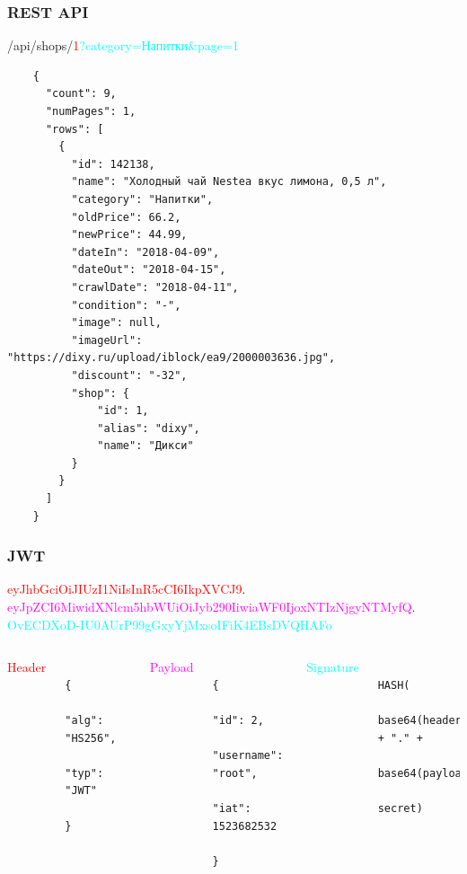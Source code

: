 \documentclass{beamer}
\begin{document}
\begin{frame}[fragile]
    \frametitle{REST API}

    /api/shops/\textcolor{red}{1}\textcolor{cyan}{?category=Напитки\&page=1}
    \medskip
    \begin{verbatim}
    {
      "count": 9,
      "numPages": 1,
      "rows": [
        {
          "id": 142138,
          "name": "Холодный чай Nestea вкус лимона, 0,5 л",
          "category": "Напитки",
          "oldPrice": 66.2,
          "newPrice": 44.99,
          "dateIn": "2018-04-09",
          "dateOut": "2018-04-15",
          "crawlDate": "2018-04-11",
          "condition": "-",
          "image": null,
          "imageUrl": "https://dixy.ru/upload/iblock/ea9/2000003636.jpg",
          "discount": "-32",
          "shop": {
              "id": 1,
              "alias": "dixy",
              "name": "Дикси"
          }
        }
      ]
    }
    \end{verbatim}
\end{frame}

\begin{frame}[fragile]
    \frametitle{JWT}
    \begin{center}
      \textcolor{red}{eyJhbGciOiJIUzI1NiIsInR5cCI6IkpXVCJ9}.
      \textcolor{magenta}{eyJpZCI6MiwidXNlcm5hbWUiOiJyb290IiwiaWF0IjoxNTIzNjgyNTMyfQ}.
      \textcolor{cyan}{OvECDXoD-IU0AUrP99gGxyYjMxsoIFiK4EBsDVQHAFo}
    \end{center}
    \medskip
    \begin{columns}[t]
        \textcolor{red}{Header}
        \medskip
        \begin{verbatim}
            {
              "alg": "HS256",
              "typ": "JWT"
            }
        \end{verbatim}
        \textcolor{magenta}{Payload}
        \medskip
        \begin{verbatim}
            {
              "id": 2,
              "username": "root",
              "iat": 1523682532
            }
        \end{verbatim}
        \textcolor{cyan}{Signature}
        \medskip
        \begin{verbatim}
            HASH(
              base64(header) + "." +
              base64(payload),
              secret)
        \end{verbatim}
    \end{columns}
\end{frame}
\end{document}
